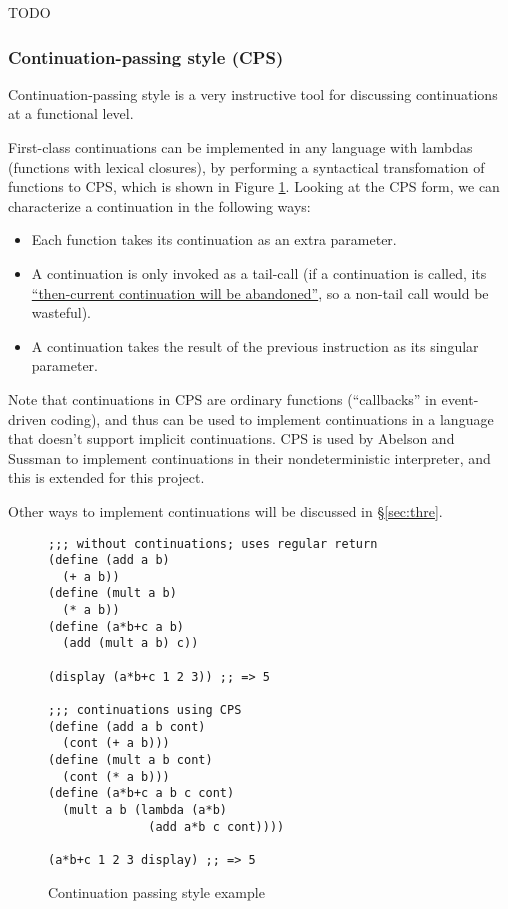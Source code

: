 \documentclass[]{article}
\begin{document}
TODO

\subsubsection{Continuation-passing style (CPS)}
\label{sec:cps}

Continuation-passing style is a very instructive tool for discussing continuations at a functional level.

First-class continuations can be implemented in any language with lambdas (functions with lexical closures), by performing a syntactical transfomation of functions to CPS, which is shown in Figure \ref{fig:cps}. Looking at the CPS form, we can characterize a continuation in the following ways:
\begin{itemize}
\item Each function takes its continuation as an extra parameter.
\item A continuation is only invoked as a tail-call (if a continuation is called, its \href{https://wiki.c2.com/?CallWithCurrentContinuation}{``then-current continuation will be abandoned''}, so a non-tail call would be wasteful).
\item A continuation takes the result of the previous instruction as its singular parameter.
\end{itemize}

Note that continuations in CPS are ordinary functions (``callbacks'' in event-driven coding), and thus can be used to implement continuations in a language that doesn't support implicit continuations. CPS is used by Abelson and Sussman to implement continuations in their nondeterministic interpreter, and this is extended for this project.

Other ways to implement continuations will be discussed in \S{\ref{sec:thre}}.

\begin{figure}[h]
  \centering
\begin{verbatim}
;;; without continuations; uses regular return
(define (add a b)
  (+ a b))
(define (mult a b)
  (* a b))
(define (a*b+c a b)
  (add (mult a b) c))

(display (a*b+c 1 2 3)) ;; => 5

;;; continuations using CPS
(define (add a b cont)
  (cont (+ a b)))
(define (mult a b cont)
  (cont (* a b)))
(define (a*b+c a b c cont)
  (mult a b (lambda (a*b)
              (add a*b c cont))))

(a*b+c 1 2 3 display) ;; => 5
\end{verbatim}
  \caption{Continuation passing style example}
  \label{fig:cps}
\end{figure}
\end{document}
